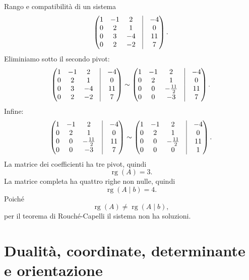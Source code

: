 \documentclass[a4paper]{article}
\begin{document}
\begin{snippetexample}{Rango e compatibilità di un sistema}
\[        \begin{pmatrix}
            1 & -1 & 2 & \vline & -4\\
            0 & 2 & 1 & \vline & 0\\
            0 & 3 & -4 & \vline & 11\\
            0 & 2 & -2 & \vline & 7
        \end{pmatrix}.
    \]
    Eliminiamo sotto il secondo pivot:
    \[
        \begin{pmatrix}
            1 & -1 & 2 & \vline & -4\\
            0 & 2 & 1 & \vline & 0\\
            0 & 3 & -4 & \vline & 11\\
            0 & 2 & -2 & \vline & 7
        \end{pmatrix}
        \sim
        \begin{pmatrix}
            1 & -1 & 2 & \vline & -4\\
            0 & 2 & 1 & \vline & 0\\
            0 & 0 & -\frac{11}{2} & \vline & 11\\
            0 & 0 & -3 & \vline & 7
        \end{pmatrix}.
    \]
    Infine:
    \[
        \begin{pmatrix}
            1 & -1 & 2 & \vline & -4\\
            0 & 2 & 1 & \vline & 0\\
            0 & 0 & -\frac{11}{2} & \vline & 11\\
            0 & 0 & -3 & \vline & 7
        \end{pmatrix}
        \sim
        \begin{pmatrix}
            1 & -1 & 2 & \vline & -4\\
            0 & 2 & 1 & \vline & 0\\
            0 & 0 & -\frac{11}{2} & \vline & 11\\
            0 & 0 & 0 & \vline & 1
        \end{pmatrix}.
    \]
    La matrice dei coefficienti ha tre pivot, quindi
    \[
        \operatorname{rg}(A)=3.
    \]
    La matrice completa ha quattro righe non nulle, quindi
    \[
        \operatorname{rg}(A\mid b)=4.
    \]
    Poiché
    \[
        \operatorname{rg}(A)\neq \operatorname{rg}(A\mid b),
    \]
    per il teorema di Rouché-Capelli il sistema non ha soluzioni.
\end{snippetexample}

\part{Dualità, coordinate, determinante e orientazione}
\end{document}
